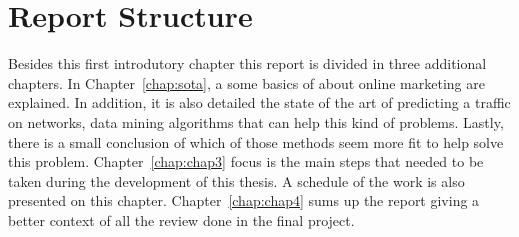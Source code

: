 \section{Report Structure} \label{sec:struct}

Besides this first introdutory chapter this report is divided in three additional chapters.
In Chapter~\ref{chap:sota}, a some basics of about online marketing are explained. In addition, it is also detailed the state of the art of
predicting a traffic on networks, data mining algorithms that can help this kind of problems. Lastly, there is
a small conclusion of which of those methods seem more fit to help solve this problem.
Chapter~\ref{chap:chap3} focus is the main steps that needed to be taken during the development of this thesis. A schedule of the work is also
presented on this chapter.
Chapter~\ref{chap:chap4} sums up the report giving a better context of all the review done in the final project.

